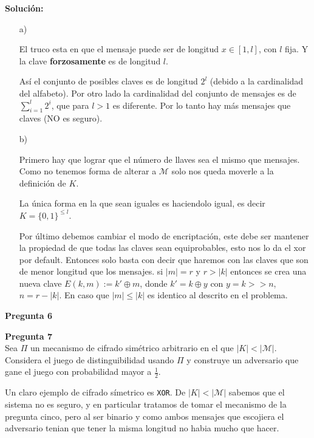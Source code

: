 \documentclass{article}
\newenvironment{problem}[2][Pregunta]
    { \begin{mdframed}[backgroundcolor=gray!20] \textbf{#1 #2} \\}
    {  \end{mdframed}}
\begin{document}
{\bf Solución:}

\begin{enumerate}
\item[a)] 

  El truco esta en que el mensaje puede ser de longitud $x\in [1, l]$, con $l$ fija. Y
  la clave {\bf forzosamente} es de longitud $l$.
  
  Así el conjunto de posibles claves es de longitud $2^l$ (debido a la cardinalidad del
  alfabeto). Por otro lado la cardinalidad del conjunto de mensajes es de $\sum_{i=1}^{l}2^i$,
  que para $l>1$ es diferente. Por lo tanto hay más mensajes que claves (NO es seguro).
  
\item[b)]

  Primero hay que lograr que el número de llaves sea el mismo que mensajes. Como
  no tenemos forma de alterar a $\mathcal{M}$ solo nos queda moverle a la definición de $K$.

  La única forma en la que sean iguales es haciendolo igual, es decir $K=\{0,1\}^{\leq l}$.

  Por último debemos cambiar el modo de encriptación, este debe ser mantener la propiedad
  de que todas las claves sean equiprobables, esto nos lo da el xor por default. Entonces
  solo basta con decir que haremos con las claves que son de menor longitud que los mensajes.
  si $|m| = r$ y $r>|k|$ entonces se crea una nueva clave $E(k,m):= k'\oplus m$, donde
  $k'= k\oplus y$ con $y=k>>n$, $n=r-|k|$. En caso que $|m|\leq|k|$ es identico al descrito
  en el problema.  
\end{enumerate}
\begin{problem}{6}
  
\end{problem}

\begin{problem}{7}
  Sea $\Pi$ un mecanismo de cifrado simétrico arbitrario en el que $|K| < |\mathcal{M}|$.
  Considera el juego de distinguibilidad usando $\Pi$ y construye un adversario que gane
  el juego con probabilidad mayor a $\frac{1}{2}$.
\end{problem}

Un claro ejemplo de cifrado símetrico es {\tt XOR}.
De $|K| < |\mathcal{M}|$ sabemos que el sistema no es seguro, y en particular tratamos de tomar el
mecanismo de la pregunta cinco, pero al ser binario y como ambos mensajes que escojiera
el adversario tenian que tener la misma longitud no habia mucho que hacer.
\end{document}
